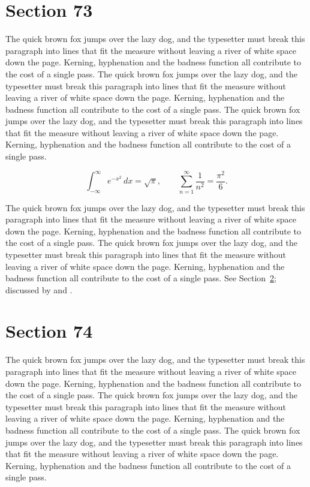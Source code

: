 \documentclass{article}
\begin{document}
\section{Section 73}
\label{sec:73}
The quick brown fox jumps over the lazy dog, and the typesetter must break this paragraph into lines that fit the measure without leaving a river of white space down the page. Kerning, hyphenation and the badness function all contribute to the cost of a single pass. The quick brown fox jumps over the lazy dog, and the typesetter must break this paragraph into lines that fit the measure without leaving a river of white space down the page. Kerning, hyphenation and the badness function all contribute to the cost of a single pass. The quick brown fox jumps over the lazy dog, and the typesetter must break this paragraph into lines that fit the measure without leaving a river of white space down the page. Kerning, hyphenation and the badness function all contribute to the cost of a single pass. 

\begin{equation}\label{eq:73}
\int_{-\infty}^{\infty} e^{-x^{2}}\,dx = \sqrt{\pi}, \qquad
\sum_{n=1}^{\infty} \frac{1}{n^{2}} = \frac{\pi^{2}}{6}.
\end{equation}

The quick brown fox jumps over the lazy dog, and the typesetter must break this paragraph into lines that fit the measure without leaving a river of white space down the page. Kerning, hyphenation and the badness function all contribute to the cost of a single pass. The quick brown fox jumps over the lazy dog, and the typesetter must break this paragraph into lines that fit the measure without leaving a river of white space down the page. Kerning, hyphenation and the badness function all contribute to the cost of a single pass. 
See Section~\ref{sec:74}; discussed by \textcite{k4} and \textcite{l1}.
\section{Section 74}
\label{sec:74}
The quick brown fox jumps over the lazy dog, and the typesetter must break this paragraph into lines that fit the measure without leaving a river of white space down the page. Kerning, hyphenation and the badness function all contribute to the cost of a single pass. The quick brown fox jumps over the lazy dog, and the typesetter must break this paragraph into lines that fit the measure without leaving a river of white space down the page. Kerning, hyphenation and the badness function all contribute to the cost of a single pass. The quick brown fox jumps over the lazy dog, and the typesetter must break this paragraph into lines that fit the measure without leaving a river of white space down the page. Kerning, hyphenation and the badness function all contribute to the cost of a single pass. 
\end{document}
